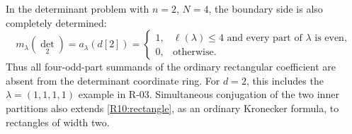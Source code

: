 \documentclass[11pt,a4paper]{article}
\theoremstyle{definition}\newtheorem{definition}{Definition}
\begin{document}
In the determinant problem with $n=2$, $N=4$, the boundary side is
also completely determined:
\begin{equation}\label{R10:closure}
m_\lambda(\det_2)=a_\lambda(d[2])=
\begin{cases}
1,&\ell(\lambda)\leq4\text{ and every part of }\lambda\text{ is even},\\
0,&\text{otherwise}.
\end{cases}
\end{equation}
Thus all four-odd-part summands of the ordinary rectangular
coefficient are absent from the determinant coordinate ring.
For $d=2$, this includes the $\lambda=(1,1,1,1)$ example in R-03.
Simultaneous conjugation of the two inner partitions also extends
\eqref{R10:rectangle}, as an ordinary Kronecker formula, to rectangles
of width two.
\end{document}
